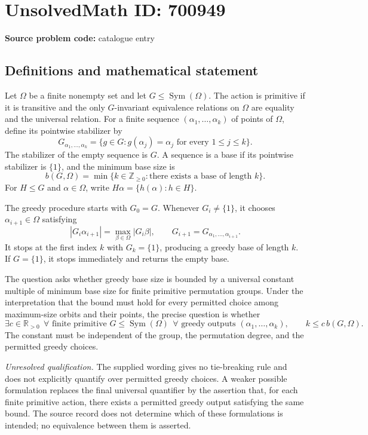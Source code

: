 \documentclass[11pt]{article}
\newcommand{\Z}{\mathbb{Z}}
\newcommand{\R}{\mathbb{R}}
\begin{document}
\section*{UnsolvedMath ID: 700949}
\textbf{Source problem code:} catalogue entry
\subsection{Definitions and mathematical statement}
Let \(\Omega\) be a finite nonempty set and let \(G\leq\operatorname{Sym}(\Omega)\). The action is primitive if it is transitive and the only \(G\)-invariant equivalence relations on \(\Omega\) are equality and the universal relation. For a finite sequence \((\alpha_1,\ldots,\alpha_k)\) of points of \(\Omega\), define its pointwise stabilizer by
\[
G_{\alpha_1,\ldots,\alpha_k}=\{g\in G:g(\alpha_j)=\alpha_j\text{ for every }1\leq j\leq k\}.
\]
The stabilizer of the empty sequence is \(G\). A sequence is a base if its pointwise stabilizer is \(\{1\}\), and the minimum base size is
\[
b(G,\Omega)=\min\{k\in\Z_{\geq0}:\text{there exists a base of length }k\}.
\]
For \(H\leq G\) and \(\alpha\in\Omega\), write \(H\alpha=\{h(\alpha):h\in H\}\).

The greedy procedure starts with \(G_0=G\). Whenever \(G_i\neq\{1\}\), it chooses \(\alpha_{i+1}\in\Omega\) satisfying
\[
|G_i\alpha_{i+1}|=\max_{\beta\in\Omega}|G_i\beta|,
\qquad
G_{i+1}=G_{\alpha_1,\ldots,\alpha_{i+1}}.
\]
It stops at the first index \(k\) with \(G_k=\{1\}\), producing a greedy base of length \(k\). If \(G=\{1\}\), it stops immediately and returns the empty base.

The question asks whether greedy base size is bounded by a universal constant multiple of minimum base size for finite primitive permutation groups. Under the interpretation that the bound must hold for every permitted choice among maximum-size orbits and their points, the precise question is whether
\[
\exists c\in\R_{>0}\ \ \forall\text{ finite primitive }G\leq\operatorname{Sym}(\Omega)\ \ \forall\text{ greedy outputs }(\alpha_1,\ldots,\alpha_k),
\qquad k\leq c\,b(G,\Omega).
\]
The constant must be independent of the group, the permutation degree, and the permitted greedy choices.

\emph{Unresolved qualification.} The supplied wording gives no tie-breaking rule and does not explicitly quantify over permitted greedy choices. A weaker possible formulation replaces the final universal quantifier by the assertion that, for each finite primitive action, there exists a permitted greedy output satisfying the same bound. The source record does not determine which of these formulations is intended; no equivalence between them is asserted.
\end{document}
